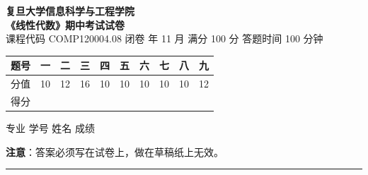 \documentclass[11pt]{ctexart}
\begin{document}
\begin{center}
{\Large\bfseries 复旦大学信息科学与工程学院}\\[4pt]
{\Large\bfseries 《线性代数》期中考试试卷}\\[8pt]
{\small 课程代码 COMP120004.08 \quad 闭卷  年 11 月 \quad 满分 100 分 \quad 答题时间 100 分钟}
\end{center}

\vspace{0.2cm}
\begin{center}
\begin{tabular}{|c|c|c|c|c|c|c|c|c|c|}
\hline
题号 & 一 & 二 & 三 & 四 & 五 & 六 & 七 & 八 & 九 \\
\hline
分值 & 10 & 12 & 16 & 10 & 10 & 10 & 10 & 10 & 12 \\
\hline
得分 & \phantom{00} & \phantom{00} & \phantom{00} & \phantom{00} & \phantom{00} & \phantom{00} & \phantom{00} & \phantom{00} & \phantom{00} \\
\hline
\end{tabular}
\end{center}

\vspace{0.2cm}
{\small 专业 \underline{\hspace{3cm}} \quad 学号 \underline{\hspace{3cm}} \quad 姓名 \underline{\hspace{3cm}} \quad 成绩 \underline{\hspace{2cm}}}

\vspace{0.3cm}
{\small\textbf{注意}：答案必须写在试卷上，做在草稿纸上无效。}

\vspace{0.4cm}
\hrule
\vspace{0.4cm}
\end{document}
